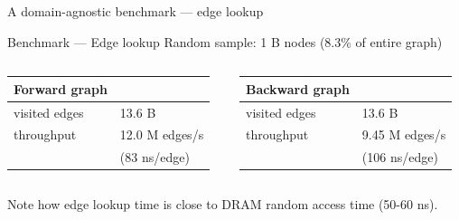\documentclass[aspectratio=169,xcolor=table]{beamer}
\begin{document}
    \begin{frame}{A domain-agnostic benchmark --- edge lookup}
        \begin{block}{Benchmark --- Edge lookup}
            Random sample: 1 B nodes (8.3\% of entire graph)
            \begin{columns}\begin{column}{0.45\textwidth}
                \begin{center}
                    \begin{tabular}{ll}
                        \alert{Forward  graph} & \\
                        \hline
                        visited edges & 13.6 B\\
                        throughput & 12.0 M edges/s\\
                                   & (83 ns/edge)\\
                    \end{tabular}
                \end{center}
                \end{column}\begin{column}{0.45\textwidth}
                \begin{center}
                    \begin{tabular}{ll}
                        \alert{Backward graph} & \\
                        \hline
                        visited edges & 13.6 B\\
                        throughput & 9.45 M edges/s\\
                                   & (106 ns/edge)\\
                    \end{tabular}
                \end{center}
            \end{column}\end{columns}
        \end{block}
        Note how edge lookup time is close to DRAM random access time (50-60 ns).
    \end{frame}

\end{document}

